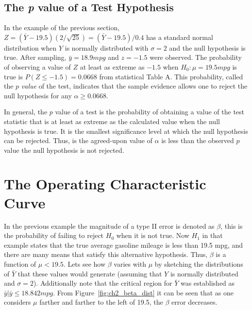 \documentclass{WileySev}
\begin{document}
\subsection{The \textit{p} value of a Test Hypothesis}

In the example of the previous section, $Z = (\bar{Y}-19.5)(2/\sqrt{25}) = (\bar{Y}-19.5)/0.4$ has a standard normal distribution when $Y$ is normally distributed with $\sigma = 2$ and the null hypothesis is true. After sampling, $\bar{y}=18.9 mpg$ and $z=-1.5$ were observed. The probability of observing a value of $Z$ at least as extreme as $-1.5$ when $H_0:\mu=19.5 mpg$ is true is $P(Z\leq-1.5)=0.0668$ from statistical Table A. This probability, called the $p$ \textit{value} of the test, indicates that the sample evidence allows one to reject the null hypothesis for any $\alpha\geq 0.0668$.

In general, the $p$ value of a test is the probability of obtaining a value of the test statistic that is at least as extreme as the calculated value when the null hypothesis is true. It is the smallest significance level at which the null hypothesis can be rejected. Thus, is the agreed-upon value of $\alpha$ is less than the observed $p$ value the null hypothesis is not rejected.

\section{The Operating Characteristic Curve}
In the previous example the magnitude of a type II error is denoted as $\beta$, this is the probability of failing to reject $H_0$ when it is not true. Now $H_1$ in that example states that the true average gasoline mileage is less than 19.5 mpg, and there are many means that satisfy this alternative hypothesis. Thus, $\beta$ is a function of $\mu < 19.5$. Lets see how $\beta$ varies with $\mu$ by sketching the distributions of $\bar{Y}$ that these values would generate (assuming that $Y$ is normally distributed and $\sigma = 2$). Additionally note that the critical region for $\bar{Y}$ was established as ${\bar{y}|\bar{y} \leq 18.842 mpg}$.
From Figure~\ref{fig:ch2_beta_dist} it can be seen that as one considers $\mu$ farther and farther to the left of 19.5, the $\beta$ error decreases.
\end{document}
